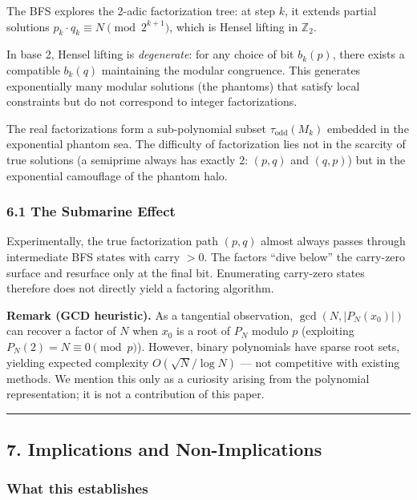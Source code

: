 \documentclass[
  11pt,
]{article}
\begin{document}
The BFS explores the 2-adic factorization tree: at step \(k\), it extends
partial solutions \(p_k \cdot q_k \equiv N \pmod{2^{k+1}}\), which is Hensel
lifting in \(\mathbb{Z}_2\).

In base 2, Hensel lifting is \emph{degenerate}: for any choice of bit
\(b_k(p)\), there exists a compatible \(b_k(q)\) maintaining the modular
congruence. This generates exponentially many modular solutions (the phantoms)
that satisfy local constraints but do not correspond to integer factorizations.

The real factorizations form a sub-polynomial subset \(\tau_{\text{odd}}(M_k)\)
embedded in the exponential phantom sea. The difficulty of factorization lies
not in the scarcity of true solutions (a semiprime always has exactly 2:
\((p,q)\) and \((q,p)\)) but in the exponential camouflage of the phantom halo.

\subsubsection{6.1 The Submarine Effect}\label{the-submarine-effect}

Experimentally, the true factorization path \((p, q)\) almost always passes
through intermediate BFS states with carry \(> 0\). The factors ``dive below''
the carry-zero surface and resurface only at the final bit. Enumerating
carry-zero states therefore does not directly yield a factoring algorithm.

\textbf{Remark (GCD heuristic).} As a tangential observation,
\(\gcd(N, |P_N(x_0)|)\) can recover a factor of \(N\) when \(x_0\) is a root of
\(P_N\) modulo \(p\) (exploiting \(P_N(2) = N \equiv 0 \pmod{p}\)). However,
binary polynomials have sparse root sets, yielding expected complexity
\(O(\sqrt{N} / \log N)\) --- not competitive with existing methods. We mention
this only as a curiosity arising from the polynomial representation; it is not a
contribution of this paper.

\begin{center}\rule{0.5\linewidth}{0.5pt}\end{center}

\newpage

\subsection{7. Implications and
Non-Implications}\label{implications-and-non-implications}

\subsubsection{What this establishes}\label{what-this-establishes}
\end{document}
